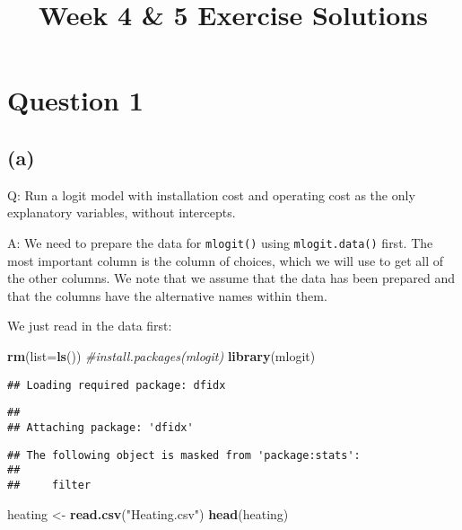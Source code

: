 \documentclass[
]{article}
\title{Week 4 \& 5 Exercise Solutions}
\author{}
\date{\vspace{-2.5em}}
\newenvironment{Shaded}{\begin{snugshade}}{\end{snugshade}}
\newcommand{\CommentTok}[1]{\textcolor[rgb]{0.56,0.35,0.01}{\textit{#1}}}
\newcommand{\DataTypeTok}[1]{\textcolor[rgb]{0.13,0.29,0.53}{#1}}
\newcommand{\KeywordTok}[1]{\textcolor[rgb]{0.13,0.29,0.53}{\textbf{#1}}}
\newcommand{\NormalTok}[1]{#1}
\newcommand{\StringTok}[1]{\textcolor[rgb]{0.31,0.60,0.02}{#1}}
\begin{document}
\maketitle

\hypertarget{question-1}{%
\section{Question 1}\label{question-1}}

\hypertarget{onea}{%
\subsection{(a)}\label{onea}}

Q: Run a logit model with installation cost and operating cost as the
only explanatory variables, without intercepts.

A: We need to prepare the data for \texttt{mlogit()} using
\texttt{mlogit.data()} first. The most important column is the column of
choices, which we will use to get all of the other columns. We note that
we assume that the data has been prepared and that the columns have the
alternative names within them.

We just read in the data first:

\begin{Shaded}
\begin{Highlighting}[]
\KeywordTok{rm}\NormalTok{(}\DataTypeTok{list=}\KeywordTok{ls}\NormalTok{())}
\CommentTok{#install.packages(mlogit)}
\KeywordTok{library}\NormalTok{(mlogit)}
\end{Highlighting}
\end{Shaded}

\begin{verbatim}
## Loading required package: dfidx
\end{verbatim}

\begin{verbatim}
## 
## Attaching package: 'dfidx'
\end{verbatim}

\begin{verbatim}
## The following object is masked from 'package:stats':
## 
##     filter
\end{verbatim}

\begin{Shaded}
\begin{Highlighting}[]
\NormalTok{heating <-}\StringTok{ }\KeywordTok{read.csv}\NormalTok{(}\StringTok{"Heating.csv"}\NormalTok{)}
\KeywordTok{head}\NormalTok{(heating)}
\end{Highlighting}
\end{Shaded}
\end{document}
